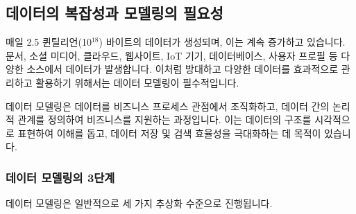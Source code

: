 \documentclass[11pt,a4paper]{article}
\begin{document}
\subsection{데이터의 복잡성과 모델링의 필요성}

매일 2.5 퀸틸리언(10$^{18}$) 바이트의 데이터가 생성되며, 이는 계속 증가하고 있습니다. 문서, 소셜 미디어, 클라우드, 웹사이트, IoT 기기, 데이터베이스, 사용자 프로필 등 다양한 소스에서 데이터가 발생합니다. 이처럼 방대하고 다양한 데이터를 효과적으로 관리하고 활용하기 위해서는 데이터 모델링이 필수적입니다.

\begin{tcolorbox}[mybox, title=데이터 모델링이란?]
데이터 모델링은 데이터를 비즈니스 프로세스 관점에서 조직화하고, 데이터 간의 논리적 관계를 정의하여 비즈니스를 지원하는 과정입니다. 이는 데이터의 구조를 시각적으로 표현하여 이해를 돕고, 데이터 저장 및 검색 효율성을 극대화하는 데 목적이 있습니다.
\end{tcolorbox}

\subsubsection{데이터 모델링의 3단계}
데이터 모델링은 일반적으로 세 가지 추상화 수준으로 진행됩니다.
\end{document}
